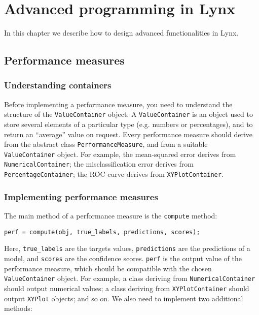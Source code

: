 \chapter{Advanced programming in Lynx}
\label{chap:advancedprogramming}

In this chapter we describe how to design advanced functionalities in Lynx.

\section{Performance measures}

\subsection{Understanding containers}

Before implementing a performance measure, you need to understand the structure of the \verb|ValueContainer| object. A \verb|ValueContainer| is an object used to store several elements of a particular type (e.g. numbers or percentages), and to return an ``average'' value on request. Every performance measure should derive from the abstract class \verb|PerformanceMeasure|, and from a suitable \verb|ValueContainer| object. For example, the mean-squared error derives from \verb|NumericalContainer|; the misclassification error derives from \verb|PercentageContainer|; the ROC curve derives from \verb|XYPlotContainer|.

\subsection{Implementing performance measures}

The main method of a performance measure is the \verb|compute| method:

\begin{lstlisting}
perf = compute(obj, true_labels, predictions, scores);
\end{lstlisting}

\noindent Here, \verb|true_labels| are the targets values, \verb|predictions| are the predictions of a model, and \verb|scores| are the confidence scores. \verb|perf| is the output value of the performance measure, which should be compatible with the chosen \verb|ValueContainer| object. For example, a class deriving from \verb|NumericalContainer| should output numerical values; a class deriving from \verb|XYPlotContainer| should output \verb|XYPlot| objects; and so on. We also need to implement two additional methods:

